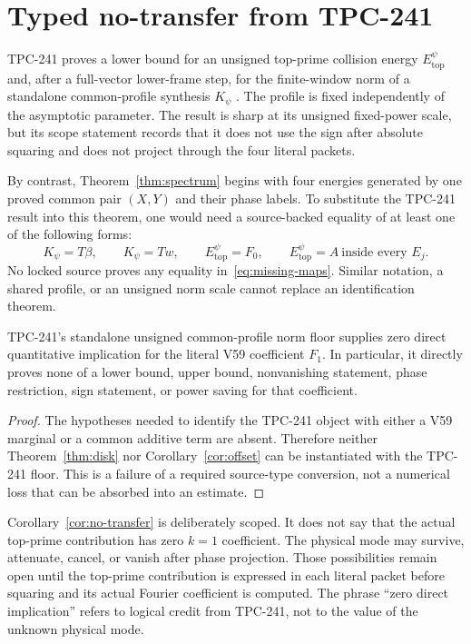 \section{Typed no-transfer from TPC-241}\label{sec:no-transfer}

TPC-241 proves a lower bound for an unsigned top-prime collision energy
$E_{\mathrm{top}}^\psi$ and, after a full-vector lower-frame step, for the
finite-window norm of a standalone common-profile synthesis $K_\psi$
\cite{WangTPC241}.  The profile is fixed independently of the asymptotic
parameter.  The result is sharp at its unsigned fixed-power scale, but its
scope statement records that it does not use the sign after absolute
squaring and does not project through the four literal packets.

By contrast, Theorem~\ref{thm:spectrum} begins with four energies generated
by one proved common pair $(X,Y)$ and their phase labels.  To substitute the
TPC-241 result into this theorem, one would need a source-backed equality of
at least one of the following forms:
\begin{equation}\label{eq:missing-maps}
 K_\psi=T\beta,\qquad K_\psi=Tw,\qquad
 E_{\mathrm{top}}^\psi=F_0,\qquad
 E_{\mathrm{top}}^\psi=A\ \text{inside every }E_j.
\end{equation}
No locked source proves any equality in~\eqref{eq:missing-maps}.  Similar
notation, a shared profile, or an unsigned norm scale cannot replace an
identification theorem.

\begin{corollary}\label{cor:no-transfer}
TPC-241's standalone unsigned common-profile norm floor supplies zero direct
quantitative implication for the literal V59 coefficient $F_1$.  In
particular, it directly proves none of a lower bound, upper bound,
nonvanishing statement, phase restriction, sign statement, or power saving
for that coefficient.
\end{corollary}

\begin{proof}
The hypotheses needed to identify the TPC-241 object with either a V59
marginal or a common additive term are absent.  Therefore neither
Theorem~\ref{thm:disk} nor Corollary~\ref{cor:offset} can be instantiated with
the TPC-241 floor.  This is a failure of a required source-type conversion,
not a numerical loss that can be absorbed into an estimate.
\end{proof}

Corollary~\ref{cor:no-transfer} is deliberately scoped.  It does not say that
the actual top-prime contribution has zero $k=1$ coefficient.  The physical
mode may survive, attenuate, cancel, or vanish after phase projection.  Those
possibilities remain open until the top-prime contribution is expressed in
each literal packet before squaring and its actual Fourier coefficient is
computed.  The phrase ``zero direct implication'' refers to logical credit
from TPC-241, not to the value of the unknown physical mode.
